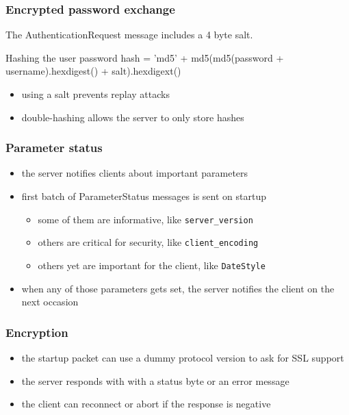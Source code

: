 \documentclass{beamer}
\begin{document}
\begin{frame}
  \frametitle{Encrypted password exchange}

  The AuthenticationRequest message includes a 4 byte salt.

  \begin{block}{Hashing the user password}
    hash = 'md5' + md5(md5(password + username).hexdigest() + salt).hexdigext()
  \end{block}

  \begin{itemize}
  \item using a salt prevents replay attacks
  \item double-hashing allows the server to only store hashes
  \end{itemize}
\end{frame}

\begin{frame}
  \frametitle{Parameter status}

  \begin{itemize}
  \item the server notifies clients about important parameters
  \item first batch of ParameterStatus messages is sent on startup
    \begin{itemize}
    \item some of them are informative, like \texttt{server\_version}
    \item others are critical for security, like \texttt{client\_encoding}
    \item others yet are important for the client, like \texttt{DateStyle}
    \end{itemize}
  \item when any of those parameters gets set, the server notifies the client
    on the next occasion
  \end{itemize}


\end{frame}

\begin{frame}
  \frametitle{Encryption}

  \begin{itemize}
  \item the startup packet can use a dummy protocol version to ask for SSL
    support
  \item the server responds with with a status byte or an error message
  \item the client can reconnect or abort if the response is negative
  \end{itemize}


\end{frame}
\end{document}
